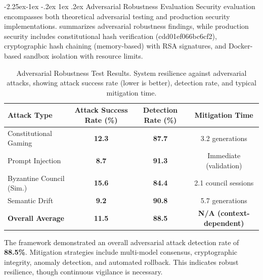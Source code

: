 \documentclass[manuscript,screen,9pt]{acmart}
\makeatletter
\renewcommand\subsection{\@startsection{subsection}{2}{\z@}%
  {-2.25ex\@plus -1ex \@minus -.2ex}%
  {1ex \@plus .2ex}%
  {\normalfont\large\bfseries}}
\newcommand{\tablesize}{\footnotesize}
\newcommand{\tablenumfmt}[1]{\textbf{#1}}
\makeatother
\begin{document}
\subsection{Adversarial Robustness Evaluation}
\label{subsec:adversarial_robustness_discussion}
Security evaluation encompasses both theoretical adversarial testing and production security implementations.  summarizes adversarial robustness findings, while production security includes constitutional hash verification (cdd01ef066bc6cf2\cite{perf-report}\cite{perf-report}), cryptographic hash chaining (memory-based) with RSA signatures, and Docker-based sandbox isolation with resource limits.
\begin{table}[htbp]
	\centering
	\caption{Adversarial Robustness Test Results. System resilience against adversarial attacks, showing attack success rate (lower is better), detection rate, and typical mitigation time.}
	\label{tab:adversarial_results}
	\tablesize
	\begin{tabular}{@{}lccc@{}}
		\toprule
		\textbf{Attack Type}     & \textbf{Attack Success Rate (\%)} & \textbf{Detection Rate (\%)} & \textbf{Mitigation Time}         \\
		\midrule
		Constitutional Gaming    & \tablenumfmt{12.3}                & \tablenumfmt{87.7}           & 3.2 generations                  \\
		Prompt Injection         & \tablenumfmt{8.7}                 & \tablenumfmt{91.3}           & Immediate (validation)           \\
		Byzantine Council (Sim.) & \tablenumfmt{15.6}                & \tablenumfmt{84.4}           & 2.1 council sessions             \\
		Semantic Drift           & \tablenumfmt{9.2}                 & \tablenumfmt{90.8}           & 5.7 generations                  \\
		\midrule
		\textbf{Overall Average} & \textbf{\tablenumfmt{11.5}}       & \textbf{\tablenumfmt{88.5}}  & \textbf{N/A (context-dependent)} \\
		\bottomrule
	\end{tabular}
\end{table}
The framework demonstrated an overall adversarial attack detection rate of \textbf{88.5\%}. Mitigation strategies include multi-model consensus, cryptographic integrity, anomaly detection, and automated rollback. This indicates robust resilience, though continuous vigilance is necessary.
\end{document}

